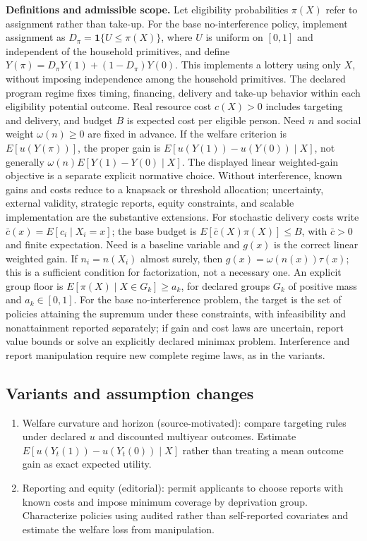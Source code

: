 \documentclass[11pt,a4paper]{article}
\newcommand{\ind}{\mathbf 1}
\begin{document}
\textbf{Definitions and admissible scope.} Let eligibility probabilities \(\pi(X)\) refer to assignment rather than take-up. For the base no-interference policy, implement assignment as \(D_\pi=\ind\{U\le\pi(X)\}\), where \(U\) is uniform on \([0,1]\) and independent of the household primitives, and define \(Y(\pi)=D_\pi Y(1)+(1-D_\pi)Y(0)\). This implements a lottery using only \(X\), without imposing independence among the household primitives. The declared program regime fixes timing, financing, delivery and take-up behavior within each eligibility potential outcome. Real resource cost \(c(X)>0\) includes targeting and delivery, and budget \(B\) is expected cost per eligible person. Need \(n\) and social weight \(\omega(n)\ge0\) are fixed in advance. If the welfare criterion is \(E[u(Y(\pi))]\), the proper gain is \(E[u(Y(1))-u(Y(0))\mid X]\), not generally \(\omega(n)E[Y(1)-Y(0)\mid X]\). The displayed linear weighted-gain objective is a separate explicit normative choice. Without interference, known gains and costs reduce to a knapsack or threshold allocation; uncertainty, external validity, strategic reports, equity constraints, and scalable implementation are the substantive extensions. For stochastic delivery costs write \(\bar c(x)=E[c_i\mid X_i=x]\); the base budget is \(E[\bar c(X)\pi(X)]\le B\), with \(\bar c>0\) and finite expectation. Need is a baseline variable and \(g(x)\) is the correct linear weighted gain. If \(n_i=n(X_i)\) almost surely, then \(g(x)=\omega(n(x))\tau(x)\); this is a sufficient condition for factorization, not a necessary one. An explicit group floor is \(E[\pi(X)\mid X\in G_k]\ge a_k\), for declared groups \(G_k\) of positive mass and \(a_k\in[0,1]\). For the base no-interference problem, the target is the set of policies attaining the supremum under these constraints, with infeasibility and nonattainment reported separately; if gain and cost laws are uncertain, report value bounds or solve an explicitly declared minimax problem. Interference and report manipulation require new complete regime laws, as in the variants.
\subsection*{Variants and assumption changes}
\begin{enumerate}
\item Welfare curvature and horizon (source-motivated): compare targeting rules under declared \(u\) and discounted multiyear outcomes. Estimate \(E[u(Y_t(1))-u(Y_t(0))\mid X]\) rather than treating a mean outcome gain as exact expected utility.
\item Reporting and equity (editorial): permit applicants to choose reports with known costs and impose minimum coverage by deprivation group. Characterize policies using audited rather than self-reported covariates and estimate the welfare loss from manipulation.
\end{enumerate}
\end{document}
